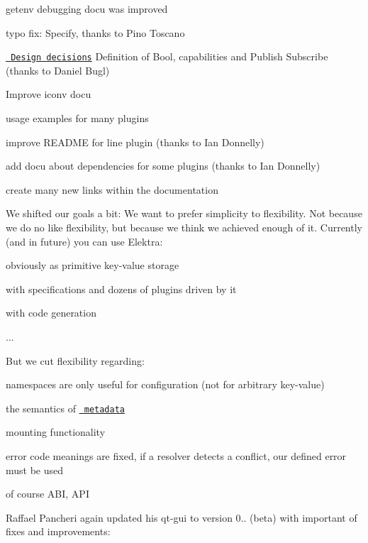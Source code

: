 \begin{DoxyItemize}
\item getenv debugging docu was improved
\item typo fix\+: Specify, thanks to Pino Toscano
\item \href{https://master.libelektra.org/doc/decisions}{\texttt{ Design decisions}} Definition of Bool, capabilities and Publish Subscribe (thanks to Daniel Bugl)
\item Improve iconv docu
\item usage examples for many plugins
\item improve R\+E\+A\+D\+ME for line plugin (thanks to Ian Donnelly)
\item add docu about dependencies for some plugins (thanks to Ian Donnelly)
\item create many new links within the documentation
\end{DoxyItemize}

We shifted our goals a bit\+: We want to prefer simplicity to flexibility. Not because we do no like flexibility, but because we think we achieved enough of it. Currently (and in future) you can use Elektra\+:


\begin{DoxyItemize}
\item obviously as primitive key-\/value storage
\item with specifications and dozens of plugins driven by it
\item with code generation
\item ...
\end{DoxyItemize}

But we cut flexibility regarding\+:


\begin{DoxyItemize}
\item namespaces are only useful for configuration (not for arbitrary key-\/value)
\item the semantics of \href{https://git.libelektra.org/blob/master/doc/METADATA.ini}{\texttt{ metadata}}
\item mounting functionality
\item error code meanings are fixed, if a resolver detects a conflict, our defined error must be used
\item of course A\+BI, A\+PI
\end{DoxyItemize}

Raffael Pancheri again updated his qt-\/gui to version 0.. (beta) with important of fixes and improvements\+:


